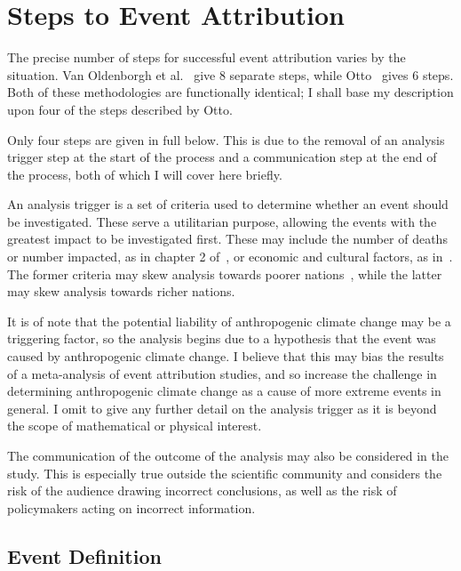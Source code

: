 \section{Steps to Event Attribution}\label{sec:attrsteps}

The precise number of steps for successful event attribution varies by the situation.
Van Oldenborgh et al.~\cite{van_Oldenborgh_et_al_2021} give 8 separate steps,
    while Otto~\cite{Otto_2017} gives 6 steps.
Both of these methodologies are functionally identical;
    I shall base my description upon four of the steps described by Otto.

Only four steps are given in full below.
This is due to the removal of an analysis trigger step at the start of the process
    and a communication step at the end of the process,
    both of which I will cover here briefly.

An analysis trigger is a set of criteria used to determine whether an event should be investigated.
These serve a utilitarian purpose,
    allowing the events with the greatest impact to be investigated first.
These may include the number of deaths or number impacted,
    as in chapter 2 of~\cite{van_Oldenborgh_et_al_2021},
    or economic and cultural factors, as in~\cite{Tett_Soon}.
The former criteria may skew analysis towards poorer nations~\cite{Kahn_2005},
    while the latter may skew analysis towards richer nations.

It is of note that the potential liability of anthropogenic climate change may be a triggering factor,
    so the analysis begins due to a hypothesis that the event was caused by anthropogenic climate change.
I believe that this may bias the results of a meta-analysis of event attribution studies,
    and so increase the challenge in determining anthropogenic climate change as a cause of more extreme events in general.
I omit to give any further detail on the analysis trigger as it is beyond the scope of mathematical or physical interest.

The communication of the outcome of the analysis may also be considered in the study.
This is especially true outside the scientific community
    and considers the risk of the audience drawing incorrect conclusions,
    as well as the risk of policymakers acting on incorrect information.

\subsection{Event Definition}\label{subsec:backeventdef}

